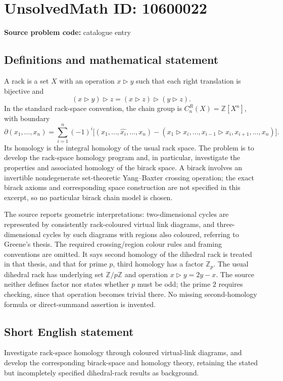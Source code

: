 \documentclass[11pt]{article}
\newcommand{\Z}{\mathbb{Z}}
\begin{document}
\section*{UnsolvedMath ID: 10600022}
\textbf{Source problem code:} catalogue entry
\subsection{Definitions and mathematical statement}
A rack is a set \(X\) with an operation \(x\triangleright y\) such that each right translation is bijective and
\[
 (x\triangleright y)\triangleright z
 =(x\triangleright z)\triangleright(y\triangleright z).
\]
In the standard rack-space convention, the chain group is \(C_n^R(X)=\Z[X^n]\), with boundary
\[
 \partial(x_1,\ldots,x_n)=\sum_{i=1}^n(-1)^i
 \bigl[(x_1,\ldots,\widehat{x_i},\ldots,x_n)
 -(x_1\triangleright x_i,\ldots,x_{i-1}\triangleright x_i,
                   x_{i+1},\ldots,x_n)\bigr].
\]
Its homology is the integral homology of the usual rack space. The problem is to develop the rack-space homology program and, in particular, investigate the properties and associated homology of the birack space. A birack involves an invertible nondegenerate set-theoretic Yang--Baxter crossing operation; the exact birack axioms and corresponding space construction are not specified in this excerpt, so no particular birack chain model is chosen.

The source reports geometric interpretations: two-dimensional cycles are represented by consistently rack-coloured virtual link diagrams, and three-dimensional cycles by such diagrams with regions also coloured, referring to Greene's thesis. The required crossing/region colour rules and framing conventions are omitted. It says second homology of the dihedral rack is treated in that thesis, and that for prime \(p\), third homology has a factor \(\Z_p\). The usual dihedral rack has underlying set \(\Z/p\Z\) and operation \(x\triangleright y=2y-x\). The source neither defines factor nor states whether \(p\) must be odd; the prime \(2\) requires checking, since that operation becomes trivial there. No missing second-homology formula or direct-summand assertion is invented.
\subsection{Short English statement}
Investigate rack-space homology through coloured virtual-link diagrams, and develop the corresponding birack-space and homology theory, retaining the stated but incompletely specified dihedral-rack results as background.
\end{document}
